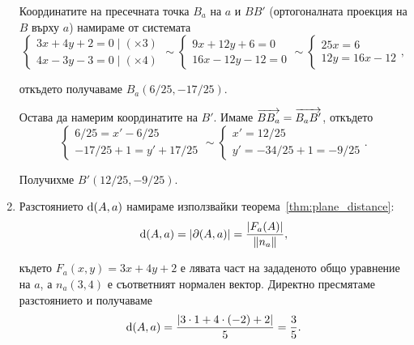\documentclass[numbers=endperiod, bibliography=totocnumbered]{scrartcl}
\begin{document}
\begin{solution}
\begin{enumerate}[label=\alph*)]
    Координатите на пресечната точка \( B_a \) на \( a \) и \( BB' \) (ортогоналната проекция на \( B \) върху \( a \)) намираме от системата
    \begin{equation*}
      \begin{cases}
        3x + 4y + 2 = 0 \mid (\times 3) \\
        4x - 3y - 3 = 0 \mid (\times 4)
      \end{cases}
      \sim
      \begin{cases}
        9x + 12y + 6 = 0 \\
        16x - 12y - 12 = 0
      \end{cases}
      \sim
      \begin{cases}
        25x = 6 \\
        12y = 16x - 12
      \end{cases},
    \end{equation*}

    откъдето получаваме \( B_a(6/25, -17/25) \).

    Остава да намерим координатите на \( B' \). Имаме \( \overrightarrow{BB_a} = \overrightarrow{B_a B'} \), откъдето
    \begin{equation*}
      \begin{cases}
        6/25 = x' - 6/25 \\
        -17/25 + 1 = y' + 17/25
      \end{cases}
      \sim
      \begin{cases}
        x' = 12/25 \\
        y' = -34/25 + 1 = -9/25
      \end{cases}.
    \end{equation*}

    Получихме \( B'(12/25, -9/25) \).

    \item Разстоянието \( \operatorname{d}(A, a) \) намираме използвайки теорема~\ref{thm:plane_distance}:
    \begin{equation*}
      \operatorname{d}(A, a) = \left\vert \partial(A, a) \right\vert = \frac {\left\vert F_a(A) \right\vert} {\left\Vert n_a \right\Vert},
    \end{equation*}

    където \( F_a(x, y) = 3x + 4y + 2 \) е лявата част на зададеното общо уравнение на \( a \), а \( n_a(3, 4) \) е съответният нормален вектор. Директно пресмятаме разстоянието и получаваме
    \begin{equation*}
      \operatorname{d}(A, a) = \frac {\left\vert 3 \cdot 1 + 4 \cdot (-2) + 2 \right\vert} 5 = \frac 3 5.
    \end{equation*}


\end{enumerate}
\end{solution}
\end{document}
